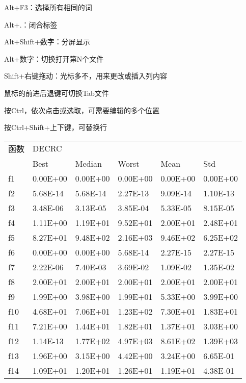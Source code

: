 \documentclass[a4paper,UTF8]{article}
\begin{document}
Alt+F3：选择所有相同的词

Alt+.：闭合标签

Alt+Shift+数字：分屏显示

Alt+数字：切换打开第N个文件

Shift+右键拖动：光标多不，用来更改或插入列内容

鼠标的前进后退键可切换Tab文件

按Ctrl，依次点击或选取，可需要编辑的多个位置

按Ctrl+Shift+上下键，可替换行

\begin{tabular}{|llllll|}
\hline
函数  & DECRC    &          &          &          &          \\
    & Best     & Median   & Worst    & Mean     & Std      \\
f1  & 0.00E+00 & 0.00E+00 & 0.00E+00 & 0.00E+00 & 0.00E+00 \\
f2  & 5.68E-14 & 5.68E-14 & 2.27E-13 & 9.09E-14 & 1.10E-13 \\
f3  & 3.48E-06 & 3.13E-05 & 3.85E-04 & 5.33E-05 & 8.15E-05 \\
f4  & 1.11E+00 & 1.19E+01 & 9.52E+01 & 2.00E+01 & 2.48E+01 \\
f5  & 8.27E+01 & 9.48E+02 & 2.16E+03 & 9.46E+02 & 6.25E+02 \\
f6  & 0.00E+00 & 0.00E+00 & 5.68E-14 & 2.27E-15 & 2.27E-15 \\
f7  & 2.22E-06 & 7.40E-03 & 3.69E-02 & 1.09E-02 & 1.35E-02 \\
f8  & 2.00E+01 & 2.00E+01 & 2.00E+01 & 2.00E+01 & 2.00E+01 \\
f9  & 1.99E+00 & 3.98E+00 & 1.99E+01 & 5.33E+00 & 3.99E+00 \\
f10 & 4.68E+01 & 7.06E+01 & 1.23E+02 & 7.30E+01 & 1.83E+01 \\
f11 & 7.21E+00 & 1.44E+01 & 1.82E+01 & 1.37E+01 & 3.03E+00 \\
f12 & 1.14E-13 & 1.77E+02 & 4.97E+03 & 8.61E+02 & 1.39E+03 \\
f13 & 1.96E+00 & 3.15E+00 & 4.42E+00 & 3.24E+00 & 6.65E-01 \\
f14 & 1.09E+01 & 1.20E+01 & 1.26E+01 & 1.19E+01 & 4.38E-01 \\
\hline
\end{tabular}
\end{document}
